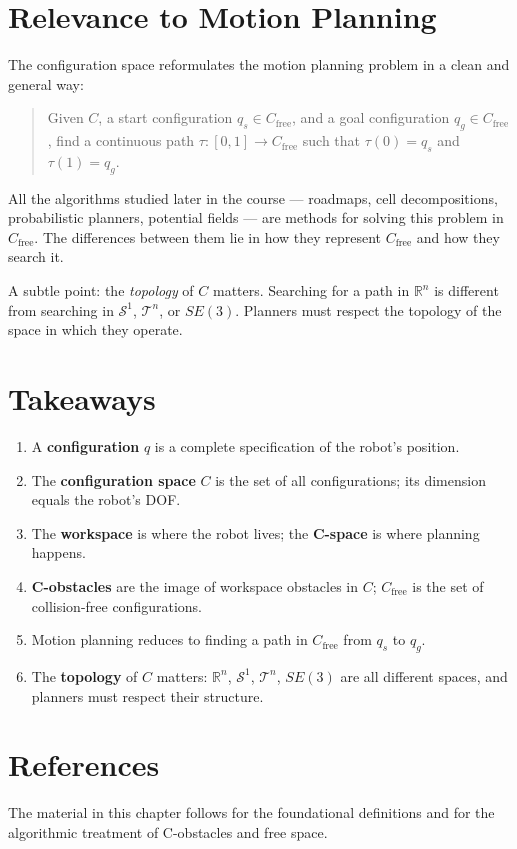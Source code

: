\section{Relevance to Motion Planning}
\label{sec:cspace-motion-planning}

The configuration space reformulates the motion planning problem in
a clean and general way:

\begin{quote}
Given \( C \), a start configuration \( q_s \in C_{\text{free}} \),
and a goal configuration \( q_g \in C_{\text{free}} \), find a
continuous path \( \tau : [0, 1] \to C_{\text{free}} \) such that
\( \tau(0) = q_s \) and \( \tau(1) = q_g \).
\end{quote}

All the algorithms studied later in the course --- roadmaps, cell
decompositions, probabilistic planners, potential fields --- are
methods for solving this problem in \( C_{\text{free}} \). The
differences between them lie in how they represent \( C_{\text{free}} \)
and how they search it.

A subtle point: the \emph{topology} of \( C \) matters. Searching for
a path in \( \mathbb{R}^n \) is different from searching in
\( \mathcal{S}^1 \), \( \mathcal{T}^n \), or \( SE(3) \). Planners
must respect the topology of the space in which they operate.

\section{Takeaways}
\label{sec:cspace-takeaways}

\begin{enumerate}
    \item A \textbf{configuration} \( q \) is a complete specification
          of the robot's position.
    \item The \textbf{configuration space} \( C \) is the set of all
          configurations; its dimension equals the robot's DOF.
    \item The \textbf{workspace} is where the robot lives; the
          \textbf{C-space} is where planning happens.
    \item \textbf{C-obstacles} are the image of workspace obstacles
          in \( C \); \textbf{\( C_{\text{free}} \)} is the set of
          collision-free configurations.
    \item Motion planning reduces to finding a path in
          \( C_{\text{free}} \) from \( q_s \) to \( q_g \).
    \item The \textbf{topology} of \( C \) matters: \( \mathbb{R}^n \),
          \( \mathcal{S}^1 \), \( \mathcal{T}^n \), \( SE(3) \) are all
          different spaces, and planners must respect their structure.
\end{enumerate}

\section{References}
\label{sec:cspace-references}

The material in this chapter follows
\cite{siciliano2025foundations} for the foundational definitions and
\cite{choset2005principles} for the algorithmic treatment of
C-obstacles and free space.